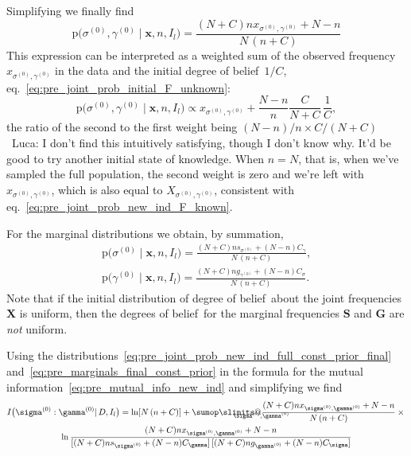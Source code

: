 \documentclass[\ifafour a4paper,12pt,\else a5paper,10pt,\fi%
onecolumn,oneside,article,%
british%
]{memoir}
\makeatletter
\theoremstyle{remark}
\theoremstyle{innote}
\def\sum{\DOTSI\sumop\slimits@}
\newcommand*{\pf}{\mathrm{p}}%
\renewcommand*{\|}{\mathpunct{|}}
\newcommand*{\eqn}{eq.}%
\newcommand*{\puzzle}{\maltese}
\newcommand{\mynote}[1]{ {\color{notecolour}\puzzle\ #1}}
\newcommand*{\dob}{degree of belief}
\newcommand*{\dobs}{degrees of belief}
\newcommand*{\yD}{D}
\newcommand*{\mI}{I}
\newcommand*{\ys}{\sigma}
\newcommand*{\yg}{\gamma}
\newcommand*{\gn}{l}
\newcommand*{\ysi}[1]{\ys^{(#1)}}
\newcommand*{\ygi}[1]{\yg^{(#1)}}
\newcommand*{\yso}{\ysi{0}}
\newcommand*{\ygo}{\ygi{0}}
\newcommand*{\yFs}{\bm{S}}
\newcommand*{\yFg}{\bm{G}}
\newcommand*{\yF}{\bm{X}}
\newcommand*{\yf}{\bm{x}}
\newcommand*{\yCs}{C_{\sigma}}
\newcommand*{\yCg}{C_{\gamma}}
\newcommand*{\yIc}{I_{\gn}}
\makeatother
\begin{document}
Simplifying we finally find
\begin{equation}
    \label{eq:pre_joint_prob_new_ind_full_const_prior_final}
  \pf\bigl(\yso, \ygo \| \yf, n,\yIc\bigr)  =
\frac{(N+C) n x_{\yso, \ygo}+N-n}{N\,(n+C)}
\end{equation}
This expression can be interpreted as a weighted sum of the observed
frequency $x_{\yso,\ygo}$ in the data and the initial \dob\ $1/C$,
\eqn~\eqref{eq:pre_joint_prob_initial_F_unknown}:
\begin{equation}
    \label{eq:pre_joint_prob_new_ind_full_const_prior_final_reinterpret}
  \pf\bigl(\yso, \ygo \| \yf, n,\yIc\bigr)  \propto
x_{\yso, \ygo}+ \frac{N-n}{n}\frac{C}{N+C}\,\frac{1}{C},
\end{equation}
the ratio of the second to the first weight being
$(N-n)/n\times C/(N+C)$\mynote{Luca: I don't find this intuitively
  satisfying, though I don't know why. It'd be good to try another initial
  state of knowledge}. When $n=N$, that is, when we've sampled the full
population, the second weight is zero and we're left with $x_{\yso,\ygo}$,
which is also equal to $X_{\yso,\ygo}$, consistent with
\eqn~\eqref{eq:pre_joint_prob_new_ind_F_known}.

For the marginal distributions we obtain, by summation,
\begin{gather}
  \label{eq:pre_marginals_final_const_prior}
    \pf\bigl(\yso \| \yf, n,\yIc\bigr)  =
\frac{(N+C) n s_{\yso}+(N-n)\yCg}{N\,(n+C)},
\\
    \pf\bigl(\ygo \| \yf, n,\yIc\bigr)  =
\frac{(N+C) n g_{\ygo}+(N-n)\yCs}{N\,(n+C)}.
\end{gather}
Note that if the initial distribution of \dob\ about the joint frequencies
$\yF$ is uniform, then the \dobs\ for the marginal frequencies $\yFs$ and
$\yFg$ are \emph{not} uniform.

Using the
distributions~\eqref{eq:pre_joint_prob_new_ind_full_const_prior_final}
and~\eqref{eq:pre_marginals_final_const_prior} in the formula for the mutual
information~\eqref{eq:pre_mutual_info_new_ind} and simplifying we find
\begin{multline}
  \label{eq:pre_mutual_info_final}
  \mI\bigl( \yso : \ygo \| \yD,\yIc \bigr) =
  \ln[N\,(n+C)] +
  \sum_{\mathclap{\yso,\ygo}}
  \frac{(N+C) n x_{\yso, \ygo}+N-n}{N\,(n+C)}\times{}\\
  \ln\frac{(N+C) n x_{\yso, \ygo}+N-n}{
    [(N+C) n s_{\yso}+(N-n)\yCg]\,
    [(N+C) n g_{\ygo}+(N-n)\yCs]
  }
\end{multline}
\end{document}
